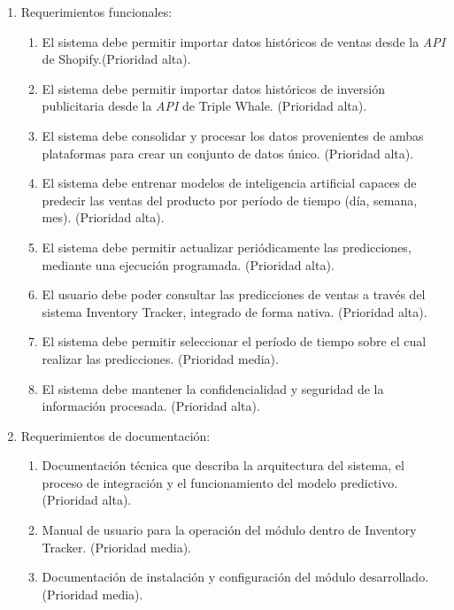 \documentclass[
11pt, %
]{charter}
\begin{document}
\begin{enumerate}
	\item Requerimientos funcionales:
		\begin{enumerate}
			\item  El sistema debe permitir importar datos históricos de ventas desde la \textit{API} de Shopify.(Prioridad alta).
			\item El sistema debe permitir importar datos históricos de inversión publicitaria desde la \textit{API} de Triple Whale. (Prioridad alta).
			\item El sistema debe consolidar y procesar los datos provenientes de ambas plataformas para crear un conjunto de datos único. (Prioridad alta).
			\item El sistema debe entrenar modelos de inteligencia artificial capaces de predecir las ventas del producto por período de tiempo (día, semana, mes). (Prioridad alta).
			\item El sistema debe permitir actualizar periódicamente las predicciones, mediante una ejecución programada. (Prioridad alta).
			\item El usuario debe poder consultar las predicciones de ventas a través del sistema Inventory Tracker, integrado de forma nativa. (Prioridad alta).
			\item El sistema debe permitir seleccionar el período de tiempo sobre el cual realizar las predicciones. (Prioridad media).
			\item El sistema debe mantener la confidencialidad y seguridad de la información procesada. (Prioridad alta).
		\end{enumerate}
	\item Requerimientos de documentación:
		\begin{enumerate}
			\item Documentación técnica que describa la arquitectura del sistema, el proceso de integración y el funcionamiento del modelo predictivo. (Prioridad alta).
			\item Manual de usuario para la operación del módulo dentro de Inventory Tracker. (Prioridad media).
			\item Documentación de instalación y configuración del módulo desarrollado. (Prioridad media).
		

\end{enumerate}
\end{enumerate}
\end{document}
